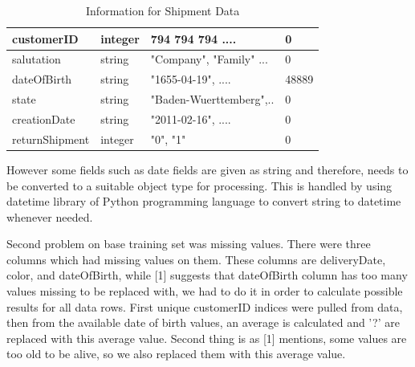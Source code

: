 \documentclass[a4paper, 10pt, conference]{ieeeconf}
\begin{document}
\begin{table}[h]
\begin{tabular}{ l l l l }
		customerID                                               & integer   & 794 794 794 ....                                        & 0                                                                 \\ \hline
		salutation                                               & string    & "Company", "Family" ...                                 & 0                                                                 \\ \hline
		dateOfBirth                                              & string    & "1655-04-19", ....                                      & 48889                                                             \\ \hline
		state                                                    & string    & "Baden-Wuerttemberg",..                                 & 0                                                                 \\ \hline
		creationDate                                             & string    & "2011-02-16", ....                                      & 0                                                                 \\ \hline
		returnShipment                                           & integer   & "0", "1"                                                & 0                                                                 \\ \hline
	\end{tabular}
	\caption{Information for Shipment Data}
\end{table}

However some fields such as date fields are given as string and therefore, needs to be converted to a suitable object type for processing. This is handled by using datetime library of Python programming language to convert string to datetime whenever needed.

Second problem on base training set was missing values. There were three columns which had missing values on them. These columns are deliveryDate, color, and dateOfBirth, while [1] suggests that dateOfBirth column has too many values missing to be replaced with, we had to do it in order to calculate possible results for all data rows. First unique customerID indices were pulled from data, then from the available date of birth values, an average is calculated and '?' are replaced with this average value. Second thing is as [1] mentions, some values are too old to be alive, so we also replaced them with this average value.
\end{document}
